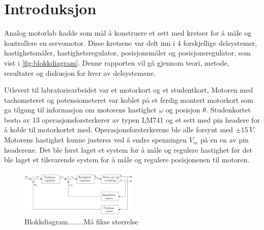 \section{Introduksjon}\label{sec:intro}

Analog motorlab hadde som mål å konstruere et sett med kretser for å måle og kontrollere en servomotor. Disse kretsene var delt inn i 4 forskjellige delsystemer, hastighetsmåler, hastighetsregulator, posisjonsmåler og posisjonsregulator, som vist i \autoref{fig:blokkdiagram}. Denne rapporten vil gå gjennom teori, metode, resultater og diskusjon for hver av delsystemene.

Utlevert til labratoriearbeidet var et motorkort og et studentkort, Motoren med tachometeret og potensiometeret var koblet på et ferdig montert motorkort som ga tilgang til informasjon om motorens hastighet $\omega$ og posisjon $\theta$. Studenkortet besto av 13 operasjonsforsterkerer av typen LM741\cite{LM741} og et sett med pin headere for å koble til motorkortet med. Operasjonsforsterkerene ble alle forsynt med $\pm15\,V$. Motorens hastighet kunne justeres ved å endre spenningen $V_m$ på en en av pin headerene. Det ble først laget et system for å måle og regulere hastighet før det ble laget et tilsvarende system for å måle og regulere posisjonenen til motoren.




\begin{figure}[b]
    \centering
    \includegraphics[width = 0.5\textwidth]{figurer/Blokkdiagram.png}
    \caption{Blokkdiagram........Må fikse størrelse}
    \label{fig:blokkdiagram}
\end{figure}







